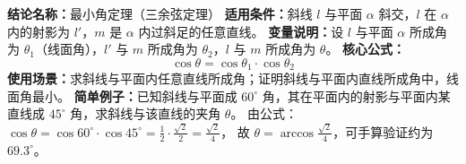 \textbf{结论名称：}最小角定理（三余弦定理）
\textbf{适用条件：}斜线 $l$ 与平面 $\alpha$ 斜交，$l$ 在 $\alpha$ 内的射影为 $l'$，$m$ 是 $\alpha$ 内过斜足的任意直线。
\textbf{变量说明：}设 $l$ 与平面 $\alpha$ 所成角为 $\theta_1$（线面角），$l'$ 与 $m$ 所成角为 $\theta_2$，$l$ 与 $m$ 所成角为 $\theta$。
\textbf{核心公式：}
\[
\boxed{\cos\theta = \cos\theta_1 \cdot \cos\theta_2}
\]
\textbf{使用场景：}求斜线与平面内任意直线所成角；证明斜线与平面内直线所成角中，线面角最小。
\textbf{简单例子：}已知斜线与平面成 $60^\circ$ 角，其在平面内的射影与平面内某直线成 $45^\circ$ 角，求斜线与该直线的夹角 $\theta$。
由公式：$\cos\theta = \cos60^\circ \cdot \cos45^\circ = \frac12 \cdot \frac{\sqrt{2}}{2} = \frac{\sqrt{2}}{4}$，
故 $\theta = \arccos\frac{\sqrt{2}}{4}$，可手算验证约为 $69.3^\circ$。
